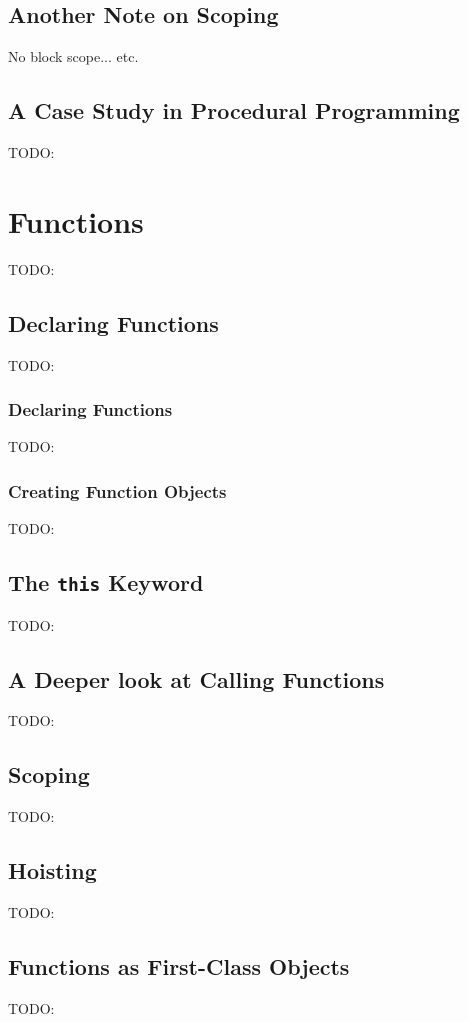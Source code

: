 \documentclass[11pt,letter]{book}
\begin{document}
    \section{Another Note on Scoping}
    No block scope... etc.
    
    \section{A Case Study in Procedural Programming}
    TODO:
    
    \chapter{Functions}
    TODO:
    
    \section{Declaring Functions}
    TODO:
    
    \subsection{Declaring Functions}
    TODO:
    
    \subsection{Creating Function Objects}
    TODO:
    
    \section{The \texttt{this} Keyword}
    TODO:
    
    \section{A Deeper look at Calling Functions}
    TODO:
    
    \section{Scoping}
    TODO:
    
    \section{Hoisting}
    TODO:
    
    \section{Functions as First-Class Objects}
    TODO:
    
\end{document}
